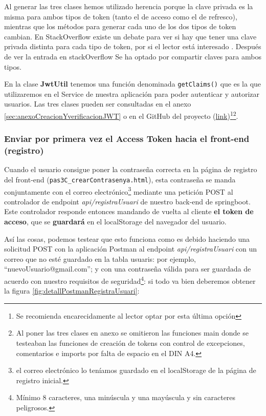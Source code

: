 \documentclass[a4paper,12pt]{report}
\begin{document}
		
		
		
		
		Al generar las tres clases hemos utilizado herencia porque la clave privada es la misma para ambos tipos de token (tanto el de acceso como el de refresco), mientras que los métodos para generar cada uno de los dos tipos de token cambian. En StackOverflow existe un debate para ver si hay que tener una clave privada distinta para cada tipo de token, por si el lector está interesado \cite{stackoverflow_jwt_refresh_token_secret}. Después de ver la entrada en stackOverflow Se ha optado por compartir claves para ambos tipos.
		
		
		En la clase \textbf{JwtUtil} tenemos una función denominada \texttt{getClaims()} que es la que utilizaremos en el Service de nuestra aplicación para poder autenticar y autorizar usuarios. Las tres clases pueden ser consultadas en el anexo \ref{sec:anexoCreacionYverificacionJWT} o en el GitHub del proyecto (\href{https://github.com/blackcub3s/mercApp/blob/main/APP%20WEB/__springboot__produccio__/app/src/main/java/miApp/app/seguretat/jwt}{link})\footnote{Se recomienda encarecidamente al lector optar por esta última opción}\footnote{Al poner las tres clases en anexo se omitieron las funciones main donde se testeaban las funciones de creación de tokens con control de excepciones, comentarios e imports por falta de espacio en el DIN A4.}.
		
		\subsubsection{Enviar por primera vez el Access Token hacia el front-end (registro)}
		\label{sec:enviarPorPrimeraVezAccesTokenDESDEBACKEND}
		
		Cuando el usuario consigue poner la contraseña correcta en la página de registro del front-end (\texttt{pas3C\_crearContrasenya.html}), esta contraseña se manda conjuntamente con el correo electrónico\footnote{el correo electrónico  lo teníamos guardado en el localStorage de la página de registro inicial.}  mediante una petición POST al controlador de endpoint \textit{api/registraUsuari} de nuestro back-end de springboot. Este controlador responde entonces mandando de vuelta al cliente \textbf{el token de acceso}, que se \textbf{guardará} en el localStorage del navegador del usuario.
		
		
		Así las cosas, podemos testear que esto funciona como es debido haciendo una solicitud POST con la aplicación Postman\cite{postman_api_platform} al endpoint \textit{api/registraUsuari} con un correo que no esté guardado en la tabla usuaris: por ejemplo, ``nuevoUsuario@gmail.com''; y con una contraseña válida para ser guardada de acuerdo con nuestro requisitos de seguridad\footnote{Mínimo 8 caracteres, una minúscula y una mayúscula y sin caracteres peligrosos.}: si todo va bien deberemos obtener la figura \ref{fig:detallPostmanRegistraUsuari}:
		
\end{document}
